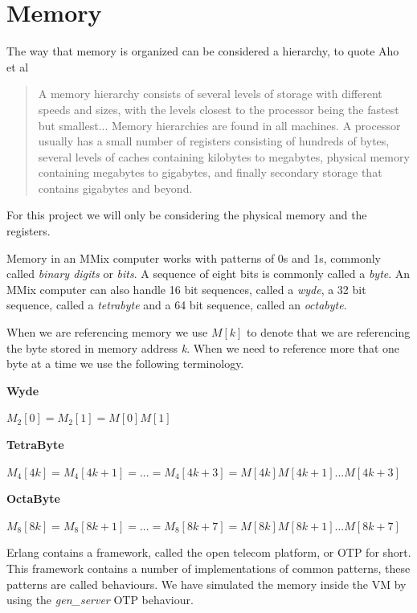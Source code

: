 \documentclass[a4paper,11pt]{report}
\begin{document}
\section{Memory}
The way that memory is organized can be considered a hierarchy, to quote Aho et al\cite{dragon}
\begin{quotation}
A memory hierarchy consists of several levels of storage with different speeds and sizes, with the levels closest to the processor being the fastest but smallest... Memory hierarchies are found in all machines. A processor usually has a small number of registers consisting of hundreds of bytes, several levels of caches containing kilobytes to megabytes, physical memory containing megabytes to gigabytes, and finally secondary storage that contains gigabytes and beyond.
\end{quotation}
For this project we will only be considering the physical memory and the registers.

Memory in an MMix computer works with patterns of 0s and 1s, commonly called \textit{binary digits} or \textit{bits}. A sequence of eight bits is commonly called a \textit{byte}. An MMix computer can also handle 16 bit sequences, called a \textit{wyde}, a 32 bit sequence, called a \textit{tetrabyte} and a 64 bit sequence, called an \textit{octabyte}.

When we are referencing memory we use \begin{math}M[k]\end{math} to denote that we are referencing the byte stored in memory address \textit{k}. When we need to reference more that one byte at a time we use the following terminology.

\textbf{Wyde}

\begin{math}
M_2[0] = M_2[1] = M[0]M[1]
\end{math}

\textbf{TetraByte}

\begin{math}
M_4[4k] = M_4[4k+1] = ... = M_4[4k+3] = M[4k]M[4k+1]...M[4k+3]
\end{math}

\textbf{OctaByte}

\begin{math}
M_8[8k] = M_8[8k+1] = ... = M_8[8k+7] = M[8k]M[8k+1]...M[8k+7]
\end{math}

Erlang contains a framework, called the open telecom platform, or OTP for short. This framework contains a number of implementations of common patterns, these patterns are called behaviours. We have simulated the memory inside the VM by using the \textit{gen\_server} OTP behaviour.
\end{document}

